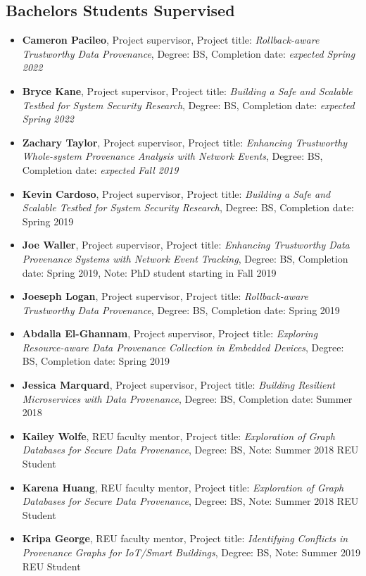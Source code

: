 \hypertarget{bs-students}{%
\subsection{Bachelors Students Supervised}\label{bs-students}}

\begin{itemize}
\tightlist
\item \textbf{Cameron Pacileo}, Project supervisor, Project title: \textit{Rollback-aware Trustworthy Data Provenance}, Degree: BS, Completion date: \textit{expected Spring 2022}
\item \textbf{Bryce Kane}, Project supervisor, Project title: \textit{Building a Safe and Scalable Testbed for System Security Research}, Degree: BS, Completion date: \textit{expected Spring 2022}
\item \textbf{Zachary Taylor}, Project supervisor, Project title: \textit{Enhancing Trustworthy Whole-system Provenance Analysis with Network Events}, Degree: BS, Completion date: \textit{expected Fall 2019}
\item \textbf{Kevin Cardoso}, Project supervisor, Project title: \textit{Building a Safe and Scalable Testbed for System Security Research}, Degree: BS, Completion date: Spring 2019
\item \textbf{Joe Waller}, Project supervisor, Project title: \textit{Enhancing Trustworthy Data Provenance Systems with Network Event Tracking}, Degree: BS, Completion date: Spring 2019, Note: PhD student starting in Fall 2019
\item \textbf{Joeseph Logan}, Project supervisor, Project title: \textit{Rollback-aware Trustworthy Data Provenance}, Degree: BS, Completion date: Spring 2019
\item \textbf{Abdalla El-Ghannam}, Project supervisor, Project title: \textit{Exploring Resource-aware Data Provenance Collection in Embedded Devices}, Degree: BS, Completion date: Spring 2019
\item \textbf{Jessica Marquard}, Project supervisor, Project title: \textit{Building Resilient Microservices with Data Provenance}, Degree: BS, Completion date: Summer 2018
\item \textbf{Kailey Wolfe}, REU faculty mentor, Project title: \textit{Exploration of Graph Databases for Secure Data Provenance}, Degree: BS, Note: Summer 2018 REU Student
\item \textbf{Karena Huang}, REU faculty mentor, Project title: \textit{Exploration of Graph Databases for Secure Data Provenance}, Degree: BS, Note: Summer 2018 REU Student
\item \textbf{Kripa George}, REU faculty mentor, Project title: \textit{Identifying Conflicts in Provenance Graphs for IoT/Smart Buildings}, Degree: BS, Note: Summer 2019 REU Student
\end{itemize}
